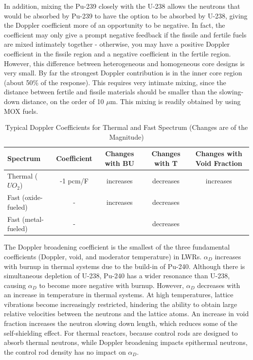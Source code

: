 \documentclass[10pt]{article}
\begin{document}
\begin{flushleft}
In addition, mixing the Pu-239 closely with the U-238 allows the neutrons that would be absorbed by Pu-239 to have the option to be absorbed by U-238, giving the Doppler coefficient more of an opportunity to be negative. In fact, the coefficient may only give a prompt negative feedback if the fissile and fertile fuels are mixed intimately together - otherwise, you may have a positive Doppler coefficient in the fissile region and a negative coefficient in the fertile region. However, this difference between heterogeneous and homogeneous core designs is very small. By far the strongest Doppler contribution is in the inner core region (about 50\% of the response). This requires very intimate mixing, since the distance between fertile and fissile materials should be smaller than the slowing-down distance, on the order of 10 \(\mu\)m. This mixing is readily obtained by using MOX fuels. 

\begin{table}[h]
\caption{Typical Doppler Coefficients for Thermal and Fast Spectrum (Changes are of the Magnitude)}
\centering
\begin{tabular}{l c c c c}
\hline\hline
 Spectrum & Coefficient & Changes with BU & Changes with T & Changes with Void Fraction
\\ [0.5ex]
\hline
Thermal (\(UO_2\)) & -1 pcm/F & increases & decreases & increases\\
Fast (oxide-fueled) & - & increases & decreases & \\
Fast (metal-fueled) & - &  & decreases & \\
\hline
\end{tabular}
\label{tab:PPer}
\end{table}

The Doppler broadening coefficient is the smallest of the three fundamental coefficients (Doppler, void, and moderator temperature) in LWRs. \(\alpha_D\) increases with burnup in thermal systems due to the build-in of Pu-240. Although there is simultaneous depletion of U-238, Pu-240 has a wider resonance than U-238, causing \(\alpha_D\) to become more negative with burnup. However, \(\alpha_D\) decreases with an increase in temperature in thermal systems. At high temperatures, lattice vibrations become increasingly restricted, hindering the ability to obtain large relative velocities between the neutrons and the lattice atoms. An increase in void fraction increases the neutron slowing down length, which reduces some of the self-shielding effect. For thermal reactors, because control rods are designed to absorb thermal neutrons, while Doppler broadening impacts epithermal neutrons, the control rod density has no impact on \(\alpha_D\). 


\end{flushleft}
\end{document}

